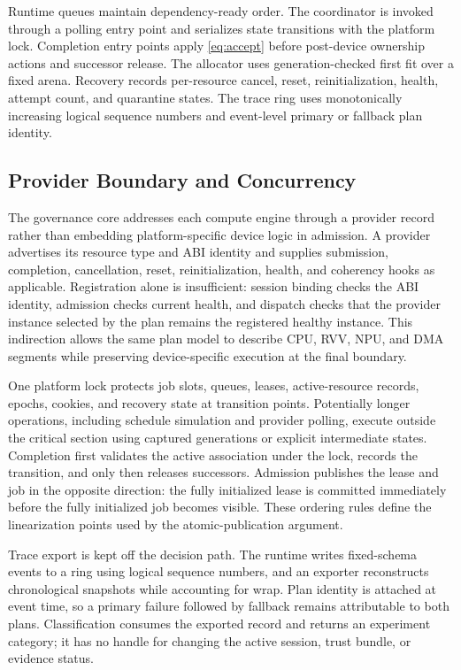 \documentclass[lettersize,journal]{IEEEtran}
\begin{document}
Runtime queues maintain dependency-ready order. The coordinator is invoked
through a polling entry point and serializes state transitions with the
platform lock. Completion entry points apply \cref{eq:accept} before
post-device ownership actions and successor release. The allocator uses
generation-checked first fit over a fixed arena. Recovery records per-resource
cancel, reset, reinitialization, health, attempt count, and quarantine states.
The trace ring uses monotonically increasing logical sequence numbers and
event-level primary or fallback plan identity.

\subsection{Provider Boundary and Concurrency}
The governance core addresses each compute engine through a provider record
rather than embedding platform-specific device logic in admission. A provider
advertises its resource type and ABI identity and supplies submission,
completion, cancellation, reset, reinitialization, health, and coherency hooks
as applicable. Registration alone is insufficient: session binding checks the
ABI identity, admission checks current health, and dispatch checks that the
provider instance selected by the plan remains the registered healthy instance.
This indirection allows the same plan model to describe CPU, RVV, NPU, and DMA
segments while preserving device-specific execution at the final boundary.

One platform lock protects job slots, queues, leases, active-resource records,
epochs, cookies, and recovery state at transition points. Potentially longer
operations, including schedule simulation and provider polling, execute outside
the critical section using captured generations or explicit intermediate
states. Completion first validates the active association under the lock,
records the transition, and only then releases successors. Admission publishes
the lease and job in the opposite direction: the fully initialized lease is
committed immediately before the fully initialized job becomes visible. These
ordering rules define the linearization points used by the atomic-publication
argument.

Trace export is kept off the decision path. The runtime writes fixed-schema
events to a ring using logical sequence numbers, and an exporter reconstructs
chronological snapshots while accounting for wrap. Plan identity is attached
at event time, so a primary failure followed by fallback remains attributable
to both plans. Classification consumes the exported record and returns an
experiment category; it has no handle for changing the active session, trust
bundle, or evidence status.
\end{document}
